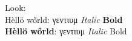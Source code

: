 \documentclass{article}
\begin{document}
Look:\\
Hèllö wőrld: γεντιυμ \textit{Italic} \textbf{Bold}\\
\textbf{Hèllö wőrld}: γεντιυμ \textit{Italic} Bold
\end{document}
